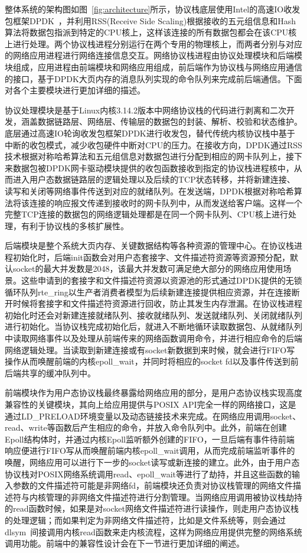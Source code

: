 整体系统的架构图如图~\ref{fig:architecture}所示，协议栈底层使用Intel的高速IO收发包框架DPDK~\cite{DPDK}，并利用RSS(Receive Side Scaling)根据接收的五元组信息和Hash算法将数据包指派到特定的CPU核上，这样该连接的所有数据包都会在该CPU核上进行处理。两个协议栈进程分别运行在两个专用的物理核上，而两者分别与对应的网络应用进程进行网络连接信息交互。网络协议栈进程由协议处理模块和后端模块组成，应用进程由前端模块和网络应用组成，前后端作为协议栈与网络应用通信的接口，基于DPDK大页内存的消息队列实现的命令队列来完成前后端通信。下面对各个主要模块进行更加详细的描述。

协议处理模块是基于Linux内核3.14.2版本中网络协议栈的代码进行剥离和二次开发，涵盖数据链路层、网络层、传输层的数据包的封装、解析、校验和状态维护。底层通过高速IO轮询收发包框架DPDK进行收发包，替代传统内核协议栈中基于中断的收包模式，减少收包硬件中断对CPU的压力。在接收方向，DPDK通过RSS技术根据对称哈希算法和五元组信息对数据包进行分配到相应的网卡队列上，接下来数据包被DPDK网卡驱动模块提供的收包函数接收到指定的协议栈进程核中，从而进入用户态数据链路层的逻辑处理以及后续的TCP状态转移，并将新建连接、读写和关闭等网络事件传送到对应的就绪队列。在发送端，DPDK根据对称哈希算法将该连接的响应报文传递到接收时的网卡队列中，从而发送给客户端。这样一个完整TCP连接的数据包的网络逻辑处理都是在同一个网卡队列、CPU核上进行处理，有利于协议栈的多核扩展性。

后端模块是整个系统大页内存、关键数据结构等各种资源的管理中心。在协议栈进程初始化时，后端init函数会对用户态套接字、文件描述符资源等资源预分配，默认socket的最大并发数是2048，该最大并发数可满足绝大部分的网络应用使用场景。这些申请到的套接字和文件描述符资源以资源池的形式通过DPDK提供的无锁循环队列rte\_ring以生产者消费者模型为后续新建连接提供相应资源，并在连接断开时候将套接字和文件描述符资源进行回收，防止其发生内存泄漏。在协议栈进程初始化时还会对新建连接就绪队列、接收就绪队列、发送就绪队列、关闭就绪队列进行初始化。当协议栈完成初始化后，就进入不断地循环读取数据包、从就绪队列中读取网络事件以及处理从前端传来的网络函数调用命令，并进行相应命令的后端网络逻辑处理。当读取到新建连接或有socket新数据到来时候，就会进行FIFO写操作从而唤醒前端的内核epoll\_wait，并同时将相应的socket fd以及事件传送到前后端共享的缓冲队列中。

前端模块作为用户态协议栈最终暴露给网络应用的部分，是用户态协议栈实现高度兼容性的关键模块，其向上给应用提供与POSIX API完全一样的网络接口，这是通过LD\_PRELOAD环境变量以及动态链接技术来完成。在网络应用调用socket、read、write等函数后产生相应的命令，并放入命令队列中。此外，前端在创建Epoll结构体时，并通过内核Epoll监听额外创建的FIFO，一旦后端有事件待前端响应便进行FIFO写从而唤醒前端内核epoll\_wait调用，从而完成前端监听事件的唤醒，网络应用可以进行下一步的socket读写或新连接的建立。此外，由于用户态协议栈对POSIX网络系统调用read、epoll\_wait等进行了劫持，并且这些函数的输入参数的文件描述符可能是非网络fd，前端模块还负责对协议栈管理的网络文件描述符与内核管理的非网络文件描述符进行分割管理。当网络应用调用被协议栈劫持的read函数时候，如果是对socket网络文件描述符进行读操作，则走用户态协议栈的处理逻辑；而如果判定为非网络文件描述符，比如是文件系统等，则会通过dlsym~\cite{DLSYM}间接调用内核read函数来走内核流程，这样为网络应用提供完整的网络系统调用功能。前端中的兼容性设计会在下一节进行更加详细的阐述。

